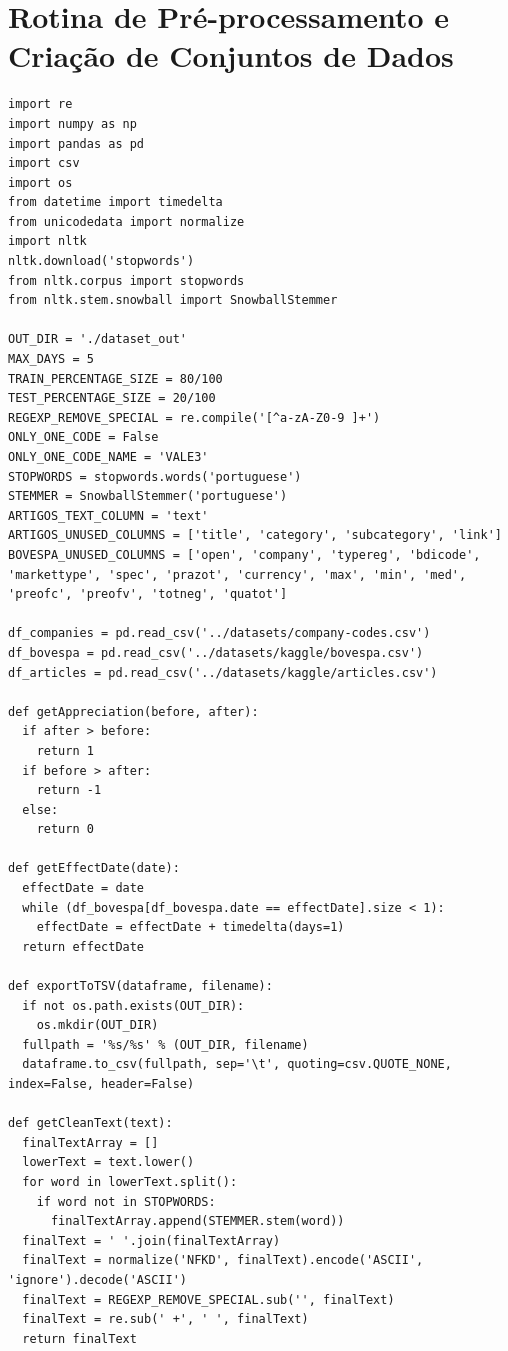 \documentclass[grad,numbers]{coppe}
\begin{document}
		\section{Rotina de Pré-processamento e Criação de Conjuntos de Dados}\label{sec:rotina-de-pre-processamento-e-criacao-de-conjuntos-de-dados}
			\begin{verbatim}
import re
import numpy as np
import pandas as pd
import csv
import os
from datetime import timedelta
from unicodedata import normalize
import nltk
nltk.download('stopwords')
from nltk.corpus import stopwords
from nltk.stem.snowball import SnowballStemmer

OUT_DIR = './dataset_out'
MAX_DAYS = 5
TRAIN_PERCENTAGE_SIZE = 80/100
TEST_PERCENTAGE_SIZE = 20/100
REGEXP_REMOVE_SPECIAL = re.compile('[^a-zA-Z0-9 ]+')
ONLY_ONE_CODE = False
ONLY_ONE_CODE_NAME = 'VALE3'
STOPWORDS = stopwords.words('portuguese')
STEMMER = SnowballStemmer('portuguese')
ARTIGOS_TEXT_COLUMN = 'text'
ARTIGOS_UNUSED_COLUMNS = ['title', 'category', 'subcategory', 'link']
BOVESPA_UNUSED_COLUMNS = ['open', 'company', 'typereg', 'bdicode', 'markettype', 'spec', 'prazot', 'currency', 'max', 'min', 'med', 'preofc', 'preofv', 'totneg', 'quatot']

df_companies = pd.read_csv('../datasets/company-codes.csv')
df_bovespa = pd.read_csv('../datasets/kaggle/bovespa.csv')
df_articles = pd.read_csv('../datasets/kaggle/articles.csv')

def getAppreciation(before, after):
  if after > before:
    return 1
  if before > after:
    return -1
  else:
    return 0

def getEffectDate(date):
  effectDate = date
  while (df_bovespa[df_bovespa.date == effectDate].size < 1):
    effectDate = effectDate + timedelta(days=1)
  return effectDate

def exportToTSV(dataframe, filename):
  if not os.path.exists(OUT_DIR):
    os.mkdir(OUT_DIR)
  fullpath = '%s/%s' % (OUT_DIR, filename)
  dataframe.to_csv(fullpath, sep='\t', quoting=csv.QUOTE_NONE, index=False, header=False)

def getCleanText(text):
  finalTextArray = []
  lowerText = text.lower()
  for word in lowerText.split():
    if word not in STOPWORDS:
      finalTextArray.append(STEMMER.stem(word))
  finalText = ' '.join(finalTextArray)
  finalText = normalize('NFKD', finalText).encode('ASCII', 'ignore').decode('ASCII')
  finalText = REGEXP_REMOVE_SPECIAL.sub('', finalText)
  finalText = re.sub(' +', ' ', finalText)
  return finalText


\end{verbatim}
\end{document}
